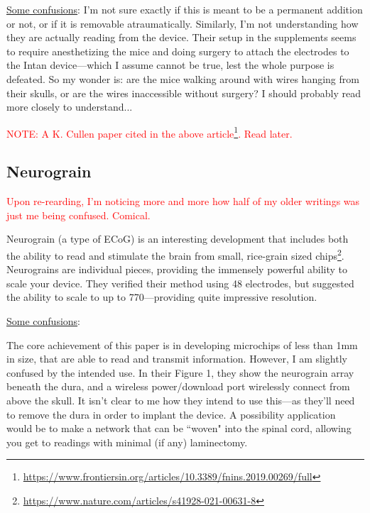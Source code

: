 \underline{Some confusions}: I'm not sure exactly if this is meant to be a permanent addition or not, or if it is removable atraumatically. Similarly, I'm not understanding how they are actually reading from the device. Their setup in the supplements seems to require anesthetizing the mice and doing surgery to attach the electrodes to the Intan device---which I assume cannot be true, lest the whole purpose is defeated. So my wonder is: are the mice walking around with wires hanging from their skulls, or are the wires inaccessible without surgery? I should probably read more closely to understand...\newline


\textcolor{red}{NOTE: A K. Cullen paper cited in the above article\footnote{\url{https://www.frontiersin.org/articles/10.3389/fnins.2019.00269/full}}. Read later.}

\subsection{Neurograin}

\textcolor{red}{Upon re-rearding, I'm noticing more and more how half of my older writings was just me being confused. Comical.}

Neurograin (a type of ECoG) is an interesting development that includes both the ability to read and stimulate the brain from small, rice-grain sized chips\footnote{\url{https://www.nature.com/articles/s41928-021-00631-8}}. Neurograins are individual pieces, providing the immensely powerful ability to scale your device. They verified their method using 48 electrodes, but suggested the ability to scale to up to 770---providing quite impressive resolution.\newline

\underline{Some confusions}:

The core achievement of this paper is in developing microchips of less than 1mm in size, that are able to read and transmit information. However, I am slightly confused by the intended use. In their Figure 1, they show the neurograin array beneath the dura, and a wireless power/download port wirelessly connect from above the skull. It isn't clear to me how they intend to use this---as they'll need to remove the dura in order to implant the device. A possibility application would be to make a network that can be ``woven" into the spinal cord, allowing you get to readings with minimal (if any) laminectomy. \newline

